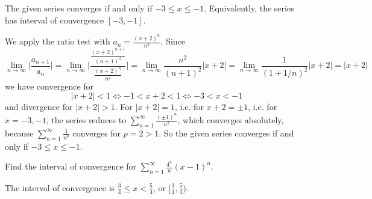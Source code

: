 \begin{answer}
The given series converges if and only if  $-3\le x\le -1$.
Equivalently, the series has interval of convergence $[-3,-1]$.
\end{answer}

\begin{solution}
We apply the ratio test with $a_n=\frac{(x+2)^n}{n^2}$.
Since
\begin{equation*}
\lim_{n\rightarrow\infty}\Big|\frac{a_{n+1}}{a_n}\Big|
=\lim_{n\rightarrow\infty}\Bigg|\frac{\frac{(x+2)^{n+1}}{(n+1)^2}}
                                       {\frac{(x+2)^n}{n^2}}\Bigg|
=\lim_{n\rightarrow\infty}\frac{n^2}{{(n+1)}^2}|x+2|
=\lim_{n\rightarrow\infty}\frac{1}{{(1+1/n)}^2}|x+2|
=|x+2|
\end{equation*}
we have convergence for
\begin{equation*}
|x+2|<1
\iff -1<x+2<1
\iff -3<x<-1
\end{equation*}
and divergence for $|x+2|>1$. For $|x+2|=1$, i.e. for $x+2=\pm 1$,
i.e. for $x=-3,-1$, the series reduces to
$\sum\limits_{n=1}^\infty\frac{(\pm 1)^n}{n^2}$, which converges absolutely,
because $\sum\limits_{n=1}^\infty\frac{1}{n^p}$ converges for $p=2>1$.
So the given series converges if and only if  $-3\le x\le -1$.
\end{solution}

\begin{question}[2016Q6]
Find the interval of convergence for $\displaystyle \sum_{n=1}^\infty \frac{4^n}{n}(x-1)^n$.
\end{question}


\begin{answer}
The interval of convergence  is $\frac{3}{4}\le x<\frac{5}{4}$,
or $\big[\frac{3}{4},\frac{5}{4}\big)$.
\end{answer}

